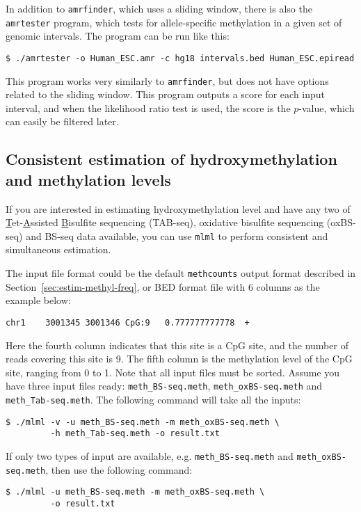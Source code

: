 \documentclass[10pt]{article}
\newcommand{\prog}[1]{\texttt{#1}}
\newcommand{\fn}[1]{\texttt{#1}}
\begin{document}
In addition to \prog{amrfinder}, which uses a sliding window, there is
also the \prog{amrtester} program, which tests for allele-specific
methylation in a given set of genomic intervals. The program can be
run like this:
\begin{verbatim}
$ ./amrtester -o Human_ESC.amr -c hg18 intervals.bed Human_ESC.epiread
\end{verbatim}
This program works very similarly to \prog{amrfinder}, but does not
have options related to the sliding window. This program outputs a
score for each input interval, and when the likelihood ratio test is
used, the score is the $p$-value, which can easily be filtered later.

\subsection{Consistent estimation of hydroxymethylation and methylation
levels}
\label{sec:hydroxy}
If you are interested in estimating hydroxymethylation level and have any
two of \underline{T}et-\underline{A}ssisted \underline{B}isulfite sequencing 
(TAB-seq), oxidative bisulfite sequencing (oxBS-seq) and BS-seq data available,
you can use \prog{mlml} \cite{qu2013mlml} to perform consistent and 
simultaneous estimation.

The input file format could be the default \prog{methcounts} output format
described in Section~\ref{sec:estim-methyl-freq}, or BED format file with 6
columns as the example below:
\begin{verbatim}
chr1    3001345 3001346 CpG:9   0.777777777778  +
\end{verbatim}
Here the fourth column indicates that this site is a CpG site, and the 
number of reads covering this site is 9. The fifth column is the 
methylation level of the CpG site, ranging from 0 to 1. Note that all input
files must be sorted. Assume you have three input files ready: 
\fn{meth\_BS-seq.meth}, \fn{meth\_oxBS-seq.meth} and \fn{meth\_Tab-seq.meth}.
The following command will take all the inputs:
\begin{verbatim}
$ ./mlml -v -u meth_BS-seq.meth -m meth_oxBS-seq.meth \
         -h meth_Tab-seq.meth -o result.txt
\end{verbatim}
If only two types of input are available, e.g. \fn{meth\_BS-seq.meth} and
\fn{meth\_oxBS-seq.meth}, then use the following command:
\begin{verbatim}
$ ./mlml -u meth_BS-seq.meth -m meth_oxBS-seq.meth \
         -o result.txt
\end{verbatim}
\end{document}
